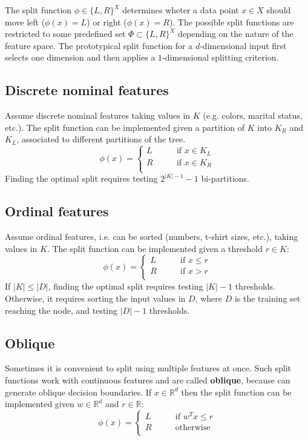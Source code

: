 The split function \(\phi \in \{L,R\}^X\) determines wheter a data point \(x \in X\) should move left (\(\phi(x) = L\)) or right (\(\phi(x) = R\)). The possible split functions are restricted to some predefined set \(\Phi \subset \{L,R\}^X\) depending on the nature of the feature space. The prototypical split function for a \(d\)-dimensional input first selects one dimension and then applies a \(1\)-dimensional splitting criterion.

\subsection{Discrete nominal features}
Assume discrete nominal features taking values in \(K\) (e.g. colors, marital status, etc.). The split function can be implemented given a partition of \(K\) into \(K_R\) and \(K_L\), associated to different partitions of the tree.
\begin{equation}
    \phi(x) = \begin{cases}
        L \qquad &\text{if }x \in K_L \\
        R \qquad &\text{if }x \in K_R \\
    \end{cases}
\end{equation}
Finding the optimal split requires testing \(2^{|K|-1}-1\) bi-partitions.

\subsection{Ordinal features}
Assume ordinal features, i.e. can be sorted (numbers, t-shirt sizes, etc.), taking values in \(K\). The split function can be implemented given a threshold \(r \in K\):
\begin{equation}
    \phi(x) = \begin{cases}
        L \qquad &\text{if }x \leq r \\
        R \qquad &\text{if }x > r \\
    \end{cases}
\end{equation}
If \(|K| \leq |D|\), finding the optimal split requires testing \(|K|-1\) thresholds. Otherwise, it requires sorting the input values in \(D\), where \(D\) is the training set reaching the node, and testing \(|D|-1\) thresholds.

\subsection{Oblique}
Sometimes it is convenient to split using multiple features at once. Such split functions work with continuous features and are called \textbf{oblique}, because can generate oblique decision boundaries. If \(x \in \mathbb{R}^d\) then the split function can be implemented given \(w \in \mathbb{R}^d\) and \(r \in \mathbb{R}\):
\begin{equation}
    \phi(x) = \begin{cases}
        L \qquad &\text{if }w^Tx \leq r \\
        R \qquad &\text{otherwise} \\
    \end{cases}
\end{equation}


